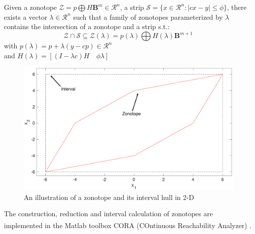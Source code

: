 \begin{lemma}\label{prop:intersect} \cite{Alamo2005}
Given a zonotope $\mathcal{Z} = p \bigoplus H\textbf{B}^m \in \mathcal{R}^n$,
 a strip $\mathscr{S} = \{x \in \mathcal{R}^n : |cx-y| \leq \phi\}$, there exists a vector $\lambda \in \mathcal{R}^n$ such that a family of zonotopes parameterized by $\lambda$ contains the intersection of a zonotope and a strip s.t.:
\begin{equation}
\mathcal{Z} \cap \mathscr{S} \subseteq \mathcal{Z}(\lambda) =  p(\lambda) \bigoplus H(\lambda) \textbf{B}^{m+1}
\end{equation} 
with $p(\lambda) = p + \lambda(y - cp) \in \mathcal{R}^n$ \\
and $H(\lambda) = [(I - \lambda c)H \quad \phi \lambda]$ 

\end{lemma}
\begin{figure}[!h]
\label{fig:zonotope}
\includegraphics[scale=1, width=\linewidth]{figures/zonotope}
\caption{An illustration of a zonotope and its interval hull in 2-D}
\end{figure}
The construction, reduction and interval calculation of zonotopes are implemented in the Matlab\textsuperscript{\tiny\textregistered} toolbox CORA (COntinuous Reachability Analyzer) \cite{Althoff2018}.
